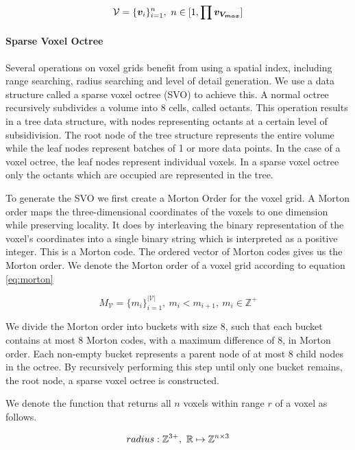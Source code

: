 \begin{equation}
    \label{eq:voxelgrid}
    \mathcal{V}=\{\boldsymbol{v}_{i}\}_{i=1}^{n},\ n \in [1, \prod{\boldsymbol{v_{V_{max}}}}]
\end{equation}


\paragraph{Sparse Voxel Octree}
Several operations on voxel grids benefit from using a spatial index, including range searching, radius searching and level of detail generation. We use a data structure called a sparse voxel octree (SVO) to achieve this. A normal octree recursively subdivides a volume into 8 cells, called octants. This operation results in a tree data structure, with nodes representing octants at a certain level of subsidivision. The root node of the tree structure represents the entire volume while the leaf nodes represent batches of 1 or more data points. In the case of a voxel octree, the leaf nodes represent individual voxels. In a sparse voxel octree only the octants which are occupied are represented in the tree. 

To generate the SVO we first create a Morton Order for the voxel grid. A Morton order maps the three-dimensional coordinates of the voxels to one dimension while preserving locality. It does by interleaving the binary representation of the voxel's coordinates into a single binary string which is interpreted as a positive integer. This is a Morton code. The ordered vector of Morton codes gives us the Morton order. We denote the Morton order of a voxel grid according to equation \ref{eq:morton}

\begin{equation}
    \label{eq:morton}
    M_{\mathcal{V}}=\{m_i\}_{i=1}^{|\mathcal{V}|},\ m_i < m_{i+1},\ m_i \in \mathbb{Z^+}
\end{equation}
    
We divide the Morton order into buckets with size 8, such that each bucket contains at most 8 Morton codes, with a maximum difference of 8, in Morton order. Each non-empty bucket represents a parent node of at most 8 child nodes in the octree. By recursively performing this step until only one bucket remains, the root node, a sparse voxel octree is constructed. 

We denote the function that returns all \(n\) voxels within range \(r\) of a voxel as follows.

\begin{equation}
    radius: \mathbb{Z}^{3+},\ \mathbb{R} \mapsto \mathbb{Z}^{n \times 3}
\end{equation}

